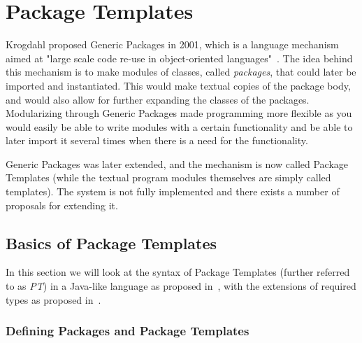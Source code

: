 \section{Package Templates}\label{sec:package-templates}


Krogdahl proposed Generic Packages in 2001, which is a language mechanism aimed at "large scale code re-use in object-oriented languages"~\cite{krogdahl:GP}.
The idea behind this mechanism is to make modules of classes, called \textit{packages}, that could later be imported and instantiated.
This would make textual copies of the package body, and would also allow for further expanding the classes of the packages.
Modularizing through Generic Packages made programming more flexible as you would easily be able to write modules with a certain functionality and be able to later import it several times when there is a need for the functionality.

Generic Packages was later extended, and the mechanism is now called Package Templates (while the textual program modules themselves are simply called templates).
The system is not fully implemented and there exists a number of proposals for extending it.

\subsection{Basics of Package Templates}\label{subsec:basics-of-package-templates}

In this section we will look at the syntax of Package Templates (further referred to as \emph{PT}) in a Java-like language as proposed in~\cite{jot}, with the extensions of required types as proposed in~\cite{requiredtypes}.

\subsubsection{Defining Packages and Package Templates}

